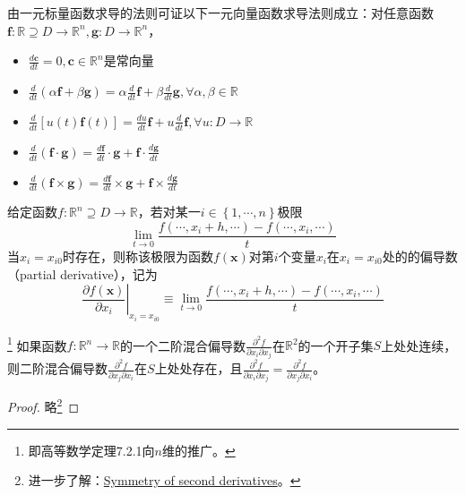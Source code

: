 \documentclass[main.tex]{subfiles}
\begin{document}
由一元标量函数求导的法则可证以下一元向量函数求导法则成立：对任意函数$\mathbf{f}:\mathbb{R}\supseteq D\rightarrow\mathbb{R}^n,\mathbf{g}:D\rightarrow\mathbb{R}^n$，
\begin{itemize}
\item $\frac{d\mathbf{c}}{dt}=0,\mathbf{c}\in\mathbb{R}^n$是常向量
\item $\frac{d}{dt}\left(\alpha\mathbf{f}+\beta\mathbf{g}\right)=\alpha\frac{d}{dt}\mathbf{f}+\beta\frac{d}{dt}\mathbf{g},\forall \alpha,\beta\in\mathbb{R}$
\item $\frac{d}{dt}\left[u\left(t\right)\mathbf{f}\left(t\right)\right]=\frac{du}{dt}\mathbf{f}+u\frac{d}{dt}\mathbf{f},\forall u:D\rightarrow\mathbb{R}$
\item $\frac{d}{dt}\left(\mathbf{f}\cdot\mathbf{g}\right)=\frac{d\mathbf{f}}{dt}\cdot\mathbf{g}+\mathbf{f}\cdot\frac{d\mathbf{g}}{dt}$
\item $\frac{d}{dt}\left(\mathbf{f}\times\mathbf{g}\right)=\frac{d\mathbf{f}}{dt}\times\mathbf{g}+\mathbf{f}\times\frac{d\mathbf{g}}{dt}$
\end{itemize}

\begin{definition}[多元标量值函数的偏导数]\label{def:II.12.4}
给定函数$f:\mathbb{R}^n\supseteq D\rightarrow\mathbb{R}$，若对某一$i\in\left\{1,\cdots,n\right\}$极限
\[
\lim_{t\to0}\frac{f\left(\cdots,x_{i}+h,\cdots\right)-f\left(\cdots,x_{i},\cdots\right)}{t}
\]
当$x_i=x_{i0}$时存在，则称该极限为函数$f\left(\mathbf{x}\right)$对第$i$个变量$x_i$在$x_i=x_{i0}$处的的偏导数（partial derivative），记为
\[\left.\frac{\partial f\left(\mathbf{x}\right)}{\partial x_i}\right|_{x_i=x_{i0}}\equiv\lim_{t\to0}\frac{f\left(\cdots,x_{i}+h,\cdots\right)-f\left(\cdots,x_i,\cdots\right)}{t}
\]
\end{definition}

\begin{theorem}\footnote{即高等数学\cite[p.~16]{华工高数2009下}定理7.2.1向$n$维的推广。}
如果函数$f:\mathbb{R}^n\rightarrow\mathbb{R}$的一个二阶混合偏导数$\frac{\partial^2f}{\partial x_i\partial x_j}$在$\mathbb{R}^2$的一个开子集$S$上处处连续，则二阶混合偏导数$\frac{\partial^2f}{\partial x_j\partial x_i}$在$S$上处处存在，且$\frac{\partial^2f}{\partial x_i\partial x_j}=\frac{\partial^2f}{\partial x_j\partial x_i}$。
\end{theorem}
\begin{proof}
略\footnote{进一步了解：\href{https://en.wikipedia.org/wiki/Symmetry_of_second_derivatives}{Symmetry of second derivatives}。}
\end{proof}
\end{document}
